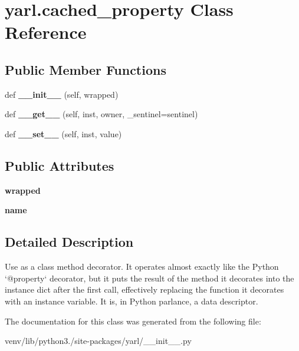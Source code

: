 \hypertarget{classyarl_1_1cached__property}{}\section{yarl.\+cached\+\_\+property Class Reference}
\label{classyarl_1_1cached__property}
\subsection*{Public Member Functions}
\begin{DoxyCompactItemize}
\item 
\mbox{\label{classyarl_1_1cached__property_aa6ab8baabb811198806b6a389ffa2b07}} 
def {\bfseries \+\_\+\+\_\+init\+\_\+\+\_\+} (self, wrapped)
\item 
\mbox{\label{classyarl_1_1cached__property_a4db8a66866b104130f303affbbdce697}} 
def {\bfseries \+\_\+\+\_\+get\+\_\+\+\_\+} (self, inst, owner, \+\_\+sentinel=sentinel)
\item 
\mbox{\label{classyarl_1_1cached__property_ace7f8c03fb13b21a35e8a9039bf1ddd4}} 
def {\bfseries \+\_\+\+\_\+set\+\_\+\+\_\+} (self, inst, value)
\end{DoxyCompactItemize}
\subsection*{Public Attributes}
\begin{DoxyCompactItemize}
\item 
\mbox{\label{classyarl_1_1cached__property_a4b770dce4d705ef7439070d7e573cdea}} 
{\bfseries wrapped}
\item 
\mbox{\label{classyarl_1_1cached__property_ab04db4549452cae29c6fc29193a4d900}} 
{\bfseries name}
\end{DoxyCompactItemize}


\subsection{Detailed Description}
\begin{DoxyVerb}Use as a class method decorator.  It operates almost exactly like
the Python `@property` decorator, but it puts the result of the
method it decorates into the instance dict after the first call,
effectively replacing the function it decorates with an instance
variable.  It is, in Python parlance, a data descriptor.\end{DoxyVerb}
 

The documentation for this class was generated from the following file\+:\begin{DoxyCompactItemize}
\item 
venv/lib/python3./site-\/packages/yarl/\+\_\+\+\_\+init\+\_\+\+\_\+.\+py\end{DoxyCompactItemize}
